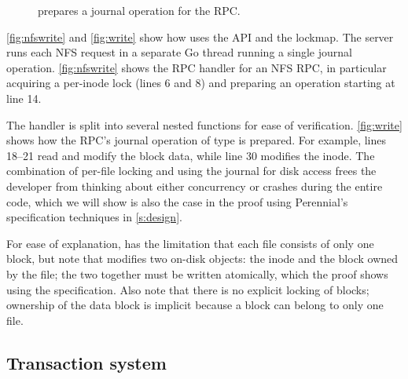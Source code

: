 \begin{figure}
  
  \vspace{-\baselineskip}
  \caption{ prepares a journal operation  for the 
    RPC.}
  \label{fig:write}
\end{figure}

\autoref{fig:nfswrite} and \autoref{fig:write} show how \simplenfs
uses the \txn API and the lockmap.  The server runs each NFS request in a
separate Go thread running a single journal operation. \autoref{fig:nfswrite}
shows the RPC handler for an NFS  RPC, in particular acquiring a
per-inode lock (lines 6 and 8) and preparing an operation starting at line 14.

The handler is split into several nested functions for ease of verification.
\autoref{fig:write} shows how the  RPC's journal operation of type
 is prepared. For example, lines 18--21 read and modify the block data,
while line 30 modifies the inode. The combination of per-file locking
and using the journal for disk access frees
the developer from thinking about either concurrency or crashes during the
entire  code, which we will show is also the case in the proof using Perennial's
specification techniques in \autoref{s:design}.

For ease of explanation, \simplenfs has the limitation that
each file consists of only one block, but note that 
modifies two on-disk objects: the inode and the block owned by
the file; the two together must be written atomically, which the proof shows
using the \txn specification.  Also note that there is no explicit
locking of blocks; ownership of the data block is implicit because a block can belong
to only one file.

\subsection{Transaction system}


